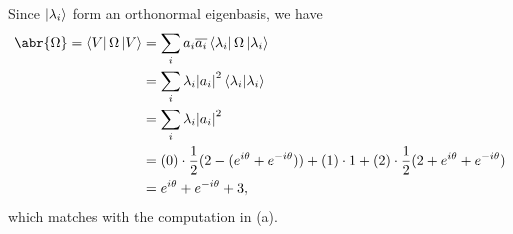 \documentclass[11pt]{article}
\begin{document}
\begin{enumerate}[label=25.\arabic*]
\begin{enumerate}[label=(\alph*)]
        Since $\ket{\lambda_i}$ form an orthonormal eigenbasis, we have \begin{align*}
            \abr{\Omega} = \bra{V}\Omega\ket{V} &= \sum_i a_i\overline{a_i}\bra{\lambda_i}\Omega\ket{\lambda_i}\\
            &= \sum_i \lambda_i\abs{a_i}^2\bra{\lambda_i}\ket{\lambda_i}\\
            &= \sum_i \lambda_i\abs{a_i}^2\\
            &= (0)\cdot\frac{1}{2}(2-(e^{i\theta} + e^{-i\theta})) + (1)\cdot 1 + (2)\cdot\frac{1}{2}(2+e^{i\theta} + e^{-i\theta})\\
            &= e^{i\theta}+e^{-i\theta}+3,
        \end{align*} which matches with the computation in (a).
    \end{enumerate}
\end{enumerate}
\end{document}
